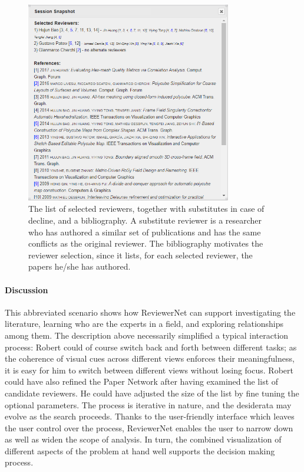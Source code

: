 \begin{figure}[!ht]
\centering
\includegraphics[width=0.8\textwidth]{fig/reviewers.png}
\caption{The list of selected reviewers, together with substitutes in case of decline, and a bibliography. A substitute reviewer is a researcher who has authored a similar set of publications and has the same conflicts as the original reviewer. The bibliography motivates the  reviewer selection, since it lists, for each selected reviewer, the papers he/she has authored.}%
\label{fig:list}
\end{figure}

\paragraph*{Discussion} 
This abbreviated scenario shows how ReviewerNet can support investigating the literature, learning who are the experts in a field, and exploring relationships among them. The description above necessarily simplified a typical interaction process: Robert could of course switch back and forth between different tasks; as the coherence of visual cues across different views enforces their meaningfulness, it is easy for him to switch between different views without losing focus. Robert could have also refined the Paper Network after having examined the list of candidate reviewers. He could have adjusted the size of the list by fine tuning the optional parameters. The process is iterative in nature, and the desiderata may evolve as the search proceeds. Thanks to the user-friendly interface which leaves the user control over the process, ReviewerNet enables the user to narrow down as well as widen the scope of analysis. In turn, the combined visualization of different aspects of the problem at hand well supports the decision making process.     
